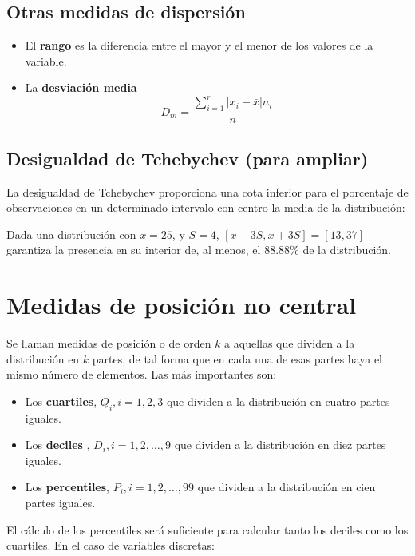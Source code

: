 \documentclass[]{book}
\theoremstyle{definition}
\theoremstyle{definition}
\theoremstyle{definition}
\theoremstyle{remark}
\begin{document}
\subsection{Otras medidas de
dispersión}\label{otras-medidas-de-dispersion}

\begin{itemize}
\item
  El \textbf{rango} es la diferencia entre el mayor y el menor de los
  valores de la variable.
\item
  La \textbf{desviación media}
  \[D_m = \frac{\sum_{i=1}^r |  x_i - \bar{x} | n_i}{n}\]
\end{itemize}

\subsection{Desigualdad de Tchebychev (para
ampliar)}\label{desigualdad-de-tchebychev-para-ampliar}

La desigualdad de Tchebychev proporciona una cota inferior para el
porcentaje de observaciones en un determinado intervalo con centro la
media de la distribución:

Dada una distribución con \(\bar{x}=25\), y \(S=4\),
\([\bar{x}-3S,\bar{x}+3S]=[13,37]\) garantiza la presencia en su
interior de, al menos, el \(88.88\%\) de la distribución.

\section{Medidas de posición no
central}\label{medidas-de-posicion-no-central}

Se llaman medidas de posición o de orden \(k\) a aquellas que dividen a
la distribución en \(k\) partes, de tal forma que en cada una de esas
partes haya el mismo número de elementos. Las más importantes son:

\begin{itemize}
\item
  Los \textbf{cuartiles}, \(Q_i, i=1,2,3\) que dividen a la distribución
  en cuatro partes iguales.
\item
  Los \textbf{deciles} , \(D_i, i=1,2, \ldots, 9\) que dividen a la
  distribución en diez partes iguales.
\item
  Los \textbf{percentiles}, \(P_i, i=1,2, \ldots, 99\) que dividen a la
  distribución en cien partes iguales.
\end{itemize}

El cálculo de los percentiles será suficiente para calcular tanto los
deciles como los cuartiles. En el caso de variables discretas:
\end{document}
